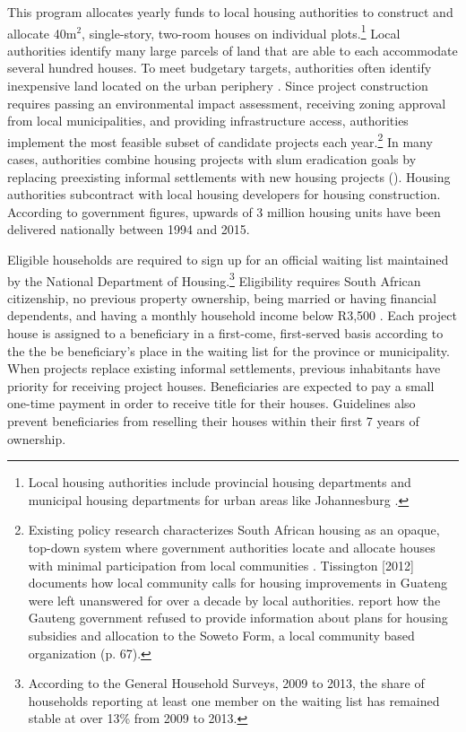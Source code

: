 \documentclass[12pt]{article}
\begin{document}
This program allocates yearly funds to local housing authorities to construct and allocate 40m$^2$, single-story, two-room houses on individual plots.\footnote{Local housing authorities include provincial housing departments and municipal housing departments for urban areas like Johannesburg \citep{dhsreports}.}  Local authorities identify many large parcels of land that are able to each accommodate several hundred houses.  To meet budgetary targets, authorities often identify inexpensive land located on the urban periphery \citep{beninterview,dhsreports}.  Since project construction requires passing an environmental impact assessment, receiving zoning approval from local municipalities, and providing infrastructure access, authorities implement the most feasible subset of candidate projects each year.\footnote{Existing policy research characterizes South African housing as an opaque, top-down system where government authorities locate and allocate houses with minimal participation from local communities \citep{seriq}.  Tissington [2012] documents how local community calls for housing improvements in Guateng were left unanswered for over a decade by local authorities.  \cite{seriq} report how the Gauteng government refused to provide information about plans for housing subsidies and allocation to the Soweto Form, a local community based organization (p. 67).}  In many cases, authorities combine housing projects with slum eradication goals by replacing preexisting informal settlements with new housing projects (\cite{hofmeyr2008risk}).  Housing authorities subcontract with local housing developers for housing construction.  According to government figures, upwards of 3 million housing units have been delivered nationally between 1994 and 2015.


Eligible households are required to sign up for an official waiting list maintained by the National Department of Housing.\footnote{According to the General Household Surveys, 2009 to 2013, the share of households reporting at least one member on the waiting list has remained stable at over 13\% from 2009 to 2013.}  Eligibility requires South African citizenship, no previous property ownership, being married or having financial dependents, and having a monthly household income below R3,500 \citep{seriq}.  Each project house is assigned to a beneficiary in a first-come, first-served basis according to the the be beneficiary's place in the waiting list for the province or municipality. When projects replace existing informal settlements, previous inhabitants have priority for receiving project houses.  Beneficiaries are expected to pay a small one-time payment in order to receive title for their houses.  Guidelines also prevent beneficiaries from reselling their houses within their first 7 years of ownership.   %
\end{document}
